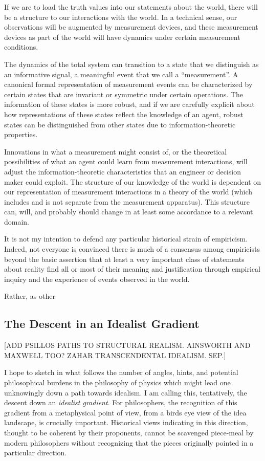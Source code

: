 If we are to load the truth values into our statements about the world, there will be a structure to our interactions with the world. In a technical sense, our observations will be augmented by measurement devices, and these measurement devices as part of the world will have dynamics under certain measurement conditions.  

The dynamics of the total system can transition to a state that we distinguish as an informative signal, a meaningful event that we call a ``measurement''.  A canonical formal representation of measurement events can be characterized by certain states that are invariant or symmetric under certain operations.  The information of these states is more robust, and if we are carefully explicit about how representations of these states reflect the knowledge of an agent, robust states can be distinguished from other states due to information-theoretic properties.

Innovations in what a measurement might consist of, or the theoretical possibilities of what an agent could learn from measurement interactions, will adjust the information-theoretic characteristics that an engineer or decision maker could exploit.  The structure of our knowledge of the world is dependent on our representation of measurement interactions in a theory of the world (which includes and is not separate from the measurement apparatus).  This structure can, will, and probably should change in at least some accordance to a relevant domain.

It is not my intention to defend any particular historical strain of empiricism.  Indeed, not everyone is convinced there is much of a consensus among empiricists beyond the basic assertion that at least a very important class of statements about reality find all or most of their meaning and justification through empirical inquiry and the experience of events observed in the world.  

Rather, as other

\subsection{The Descent in an Idealist Gradient}



[ADD PSILLOS PATHS TO STRUCTURAL REALISM.  AINSWORTH AND MAXWELL TOO?  ZAHAR TRANSCENDENTAL IDEALISM. SEP.]



I hope to sketch in what follows the number of angles, hints, and potential philosophical burdens in the philosophy of physics which might lead one unknowingly down a path towards idealism.  I am calling this, tentatively, the descent down an \emph{idealist gradient}.  For philosophers, the recognition of this gradient from a metaphysical point of view, from a birds eye view of the idea landscape, is crucially important.  Historical views indicating in this direction, thought to be coherent by their proponents, cannot be scavenged piece-meal by modern philosophers without recognizing that the pieces originally pointed in a particular direction.

